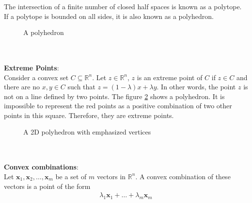 The intersection of a finite number of closed half spaces is known as a polytope. If a polytope is bounded on all sides, it is also known as a polyhedron.
\begin{figure}[h]
  \centering
  \caption{A polyhedron}
  \label{fig:polyhedron}
\end{figure}
\\ \\ 
\textbf{Extreme Points}: 
\\
Consider a convex set $C \subseteq \mathbb{R}^n$. Let $z \in \mathbb{R}^n$, $z$ is an extreme point of $C$ if $z \in C$ and there are no $x,y \in C$ such that $z = (1-\lambda)x + \lambda y$. In other words, the point $z$ is not on a line defined by two points. The figure \ref{fig:2d_polyhedron} shows a polyhedron. It is impossible to represent the red points as a positive combination of two other points in this square. Therefore, they are extreme points.
\begin{figure}[h]
  \centering
  \caption{A 2D polyhedron with emphasized vertices}
  \label{fig:2d_polyhedron}
\end{figure}
\\ \\
\textbf{Convex combinations}: 
\\
Let $\textbf{x}_1, \textbf{x}_2, \dots, \textbf{x}_m$ be a set of $m$ vectors in $\mathbb{R}^n$. A convex combination of these vectors is a point of the form
\begin{gather}
  \lambda_1 \textbf{x}_1 + \dots + \lambda_m \textbf{x}_m
\end{gather}
